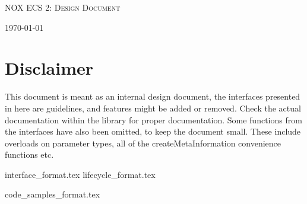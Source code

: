 \documentclass[hidelinks]{article}
\begin{document}
\begin{titlepage}
    \centering
    {\scshape\LARGE NOX ECS 2: Design Document \par}
    \vfill
    {\large \today\par}
\end{titlepage}

\tableofcontents
\pagebreak

\section{Disclaimer}
This document is meant as an internal design document,
the interfaces presented in here are guidelines, and features might be added or removed.
Check the actual documentation within the library for proper documentation.
Some functions from the interfaces have also been omitted, to keep the document small. 
These include overloads on parameter types, all of the createMetaInformation convenience functions etc.

{interface_format.tex}
\pagebreak
{lifecycle_format.tex}
\pagebreak



\pagebreak
{code_samples_format.tex}
\end{document}
